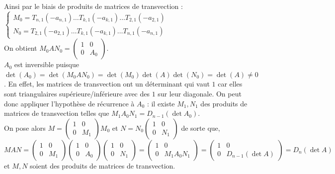 \documentclass[8pt]{book}
\begin{document}
	Ainsi par le biais de produits de matrices de transvection :\\
	$\begin{cases}
		M_0=T_{n,1}(-a_{n,1})\dots T_{k,1}(-a_{k,1})\dots T_{2,1}(-a_{2,1})\\
		N_0=T_{2,1}(-a_{2,1})\dots T_{k,1}(-a_{k,1})\dots T_{n,1}(-a_{n,1})
	\end{cases}$\\
	On obtient $M_0AN_0=\left(\begin{array}{c|c}1&0\\\hline0&A_0\end{array}\right)$.\\
	$A_0$ est inversible puisque $\det(A_0)=\det(M_0AN_0)=\det(M_0)\det(A)\det(N_0)=\det(A)\ne 0$. En effet, les matrices de transvection ont un déterminant qui vaut $1$ car elles sont triangulaires supérieure/inférieure avec des $1$ sur leur diagonale. On peut donc appliquer l'hypothèse de récurrence à $A_0$ : il existe $M_1,N_1$ des produits de matrices de transvection telles que $M_1A_0N_1=D_{n-1}(\det A_0)$.\\
	On pose alors $M=\left(\begin{array}{c|c}1&0\\\hline0&M_1\end{array}\right)M_0$ et $N=N_0\left(\begin{array}{c|c}1&0\\\hline0&N_1\end{array}\right)$ de sorte que,\\
	$MAN=\left(\begin{array}{c|c}1&0\\\hline0&M_1\end{array}\right)\left(\begin{array}{c|c}1&0\\\hline0&A_0\end{array}\right)\left(\begin{array}{c|c}1&0\\\hline0&N_1\end{array}\right)=\left(\begin{array}{c|c}1&0\\\hline0&M_1A_0N_1\end{array}\right)=\left(\begin{array}{c|c}1&0\\\hline0&D_{n-1}(\det A)\end{array}\right)=D_n(\det A)$ et $M,N$ soient des produits de matrices de transvection.\\
\end{document}
